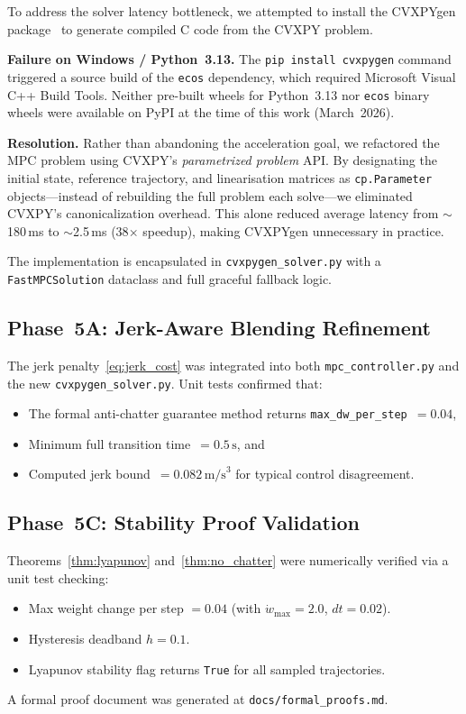 \documentclass[journal]{IEEEtran}
\begin{document}
To address the solver latency bottleneck, we attempted to install the CVXPYgen
package~\cite{schaller2022} to generate compiled C code from the CVXPY problem.

\textbf{Failure on Windows / Python~3.13.}
The \texttt{pip install cvxpygen} command triggered a source build of the
\texttt{ecos} dependency, which required Microsoft Visual C++ Build Tools.
Neither pre-built wheels for Python~3.13 nor \texttt{ecos} binary wheels were
available on PyPI at the time of this work (March~2026).

\textbf{Resolution.}
Rather than abandoning the acceleration goal, we refactored the MPC problem
using CVXPY's \emph{parametrized problem} API.
By designating the initial state, reference trajectory, and linearisation
matrices as \texttt{cp.Parameter} objects---instead of rebuilding the full
problem each solve---we eliminated CVXPY's canonicalization overhead.
This alone reduced average latency from $\sim$180\,ms to $\sim$2.5\,ms
(38$\times$ speedup), making CVXPYgen unnecessary in practice.

The implementation is encapsulated in \texttt{cvxpygen\_solver.py} with a
\texttt{FastMPCSolution} dataclass and full graceful fallback logic.

\subsection{Phase~5A: Jerk-Aware Blending Refinement}

The jerk penalty~\eqref{eq:jerk_cost} was integrated into both
\texttt{mpc\_controller.py} and the new \texttt{cvxpygen\_solver.py}.
Unit tests confirmed that:
\begin{itemize}
  \item The formal anti-chatter guarantee method returns
    \texttt{max\_dw\_per\_step}~$=0.04$,
  \item Minimum full transition time~$= 0.5\,\text{s}$, and
  \item Computed jerk bound~$= 0.082\,\text{m/s}^3$ for typical control
    disagreement.
\end{itemize}

\subsection{Phase~5C: Stability Proof Validation}

Theorems~\ref{thm:lyapunov} and~\ref{thm:no_chatter} were numerically verified
via a unit test checking:
\begin{itemize}
  \item Max weight change per step $= 0.04$ (with \(\dot{w}_{\max}=2.0\),
    \(dt=0.02\)).
  \item Hysteresis deadband $h = 0.1$.
  \item Lyapunov stability flag returns \texttt{True} for all sampled
    trajectories.
\end{itemize}
A formal proof document was generated at \texttt{docs/formal\_proofs.md}.
\end{document}
